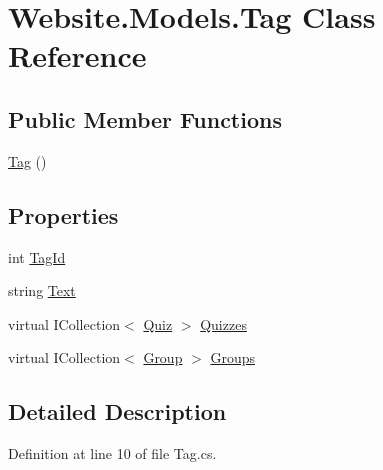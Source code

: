 \hypertarget{class_website_1_1_models_1_1_tag}{}\section{Website.\+Models.\+Tag Class Reference}
\label{class_website_1_1_models_1_1_tag}
\subsection*{Public Member Functions}
\begin{DoxyCompactItemize}
\item 
\hyperlink{class_website_1_1_models_1_1_tag_a6f80c3f548af90afd060b6d19c460904}{Tag} ()
\end{DoxyCompactItemize}
\subsection*{Properties}
\begin{DoxyCompactItemize}
\item 
int \hyperlink{class_website_1_1_models_1_1_tag_ae9c7e4358c988e6f72ed69489987d180}{Tag\+Id}
\item 
string \hyperlink{class_website_1_1_models_1_1_tag_a0ec1a5085cd4b2c99c9c421bcf2f0b17}{Text}
\item 
virtual I\+Collection$<$ \hyperlink{class_website_1_1_models_1_1_quiz}{Quiz} $>$ \hyperlink{class_website_1_1_models_1_1_tag_a5baeaf16a842097ef62f9fcb2e5a018a}{Quizzes}
\item 
virtual I\+Collection$<$ \hyperlink{class_website_1_1_models_1_1_group}{Group} $>$ \hyperlink{class_website_1_1_models_1_1_tag_a50d9f430fcb781d52b9cade9a46cb08a}{Groups}
\end{DoxyCompactItemize}


\subsection{Detailed Description}


Definition at line 10 of file Tag.\+cs.



